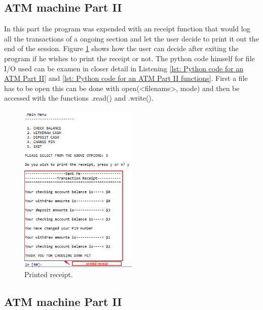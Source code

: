 \subsection{ATM machine Part II}\label{subsec: ATM machine Part II}
In this part the program was expended with an receipt function that would log all the transactions of a ongoing section and let the user decide to print it out the end of the session. Figure \ref{fig: Printed receipt} shows how the user can decide after exiting the program if he wishes to print the receipt or not. The python code himself for file I/O used can be examen in closer detail in Listening \ref{lst: Python code for an ATM Part II} and \ref{lst: Python code for an ATM Part II functions}. First a file has to be open this can be done with open(<filename>, mode) and then be accessed with the functions .read() and .write(). 

\begin{figure}[H]
	\centering
	\includegraphics[width=0.5\textwidth]{01_images/printed_receipt.PNG}
	\caption{Printed receipt.}
	\label{fig: Printed receipt}
\end{figure}

\subsection{ATM machine Part II}\label{subsec: ATM machine Part III}

